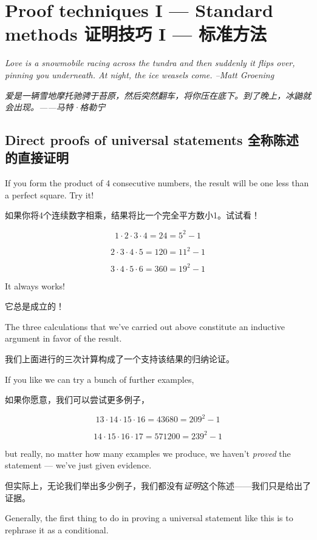

\chapter[Proof techniques I]{Proof techniques I --- Standard methods 证明技巧 I --- 标准方法}
\label{ch:proof1}

{\em Love is a snowmobile racing across the tundra and then suddenly it %
 flips over, pinning you underneath. At night, the  %
 ice weasels come. --Matt Groening} 

{\em 爱是一辆雪地摩托驰骋于苔原，然后突然翻车，将你压在底下。到了晚上，冰鼬就会出现。——马特·格勒宁}

\section{Direct proofs of universal statements 全称陈述的直接证明}
\label{sec:direct}

If you form the product of 4 consecutive numbers, the result will be one 
less than a perfect square. Try it!

如果你将4个连续数字相乘，结果将比一个完全平方数小1。试试看！

\[ 1 \cdot 2 \cdot 3 \cdot 4 = 24 = 5^2 - 1 \]

\[ 2 \cdot 3 \cdot 4 \cdot 5 = 120 = 11^2 - 1 \]

\[ 3 \cdot 4 \cdot 5 \cdot 6 = 360 = 19^2 - 1 \]

It always works!

它总是成立的！

The three calculations that we've carried out above constitute an
inductive argument in favor of the result.

我们上面进行的三次计算构成了一个支持该结果的归纳论证。

If you like we can try 
a bunch of further examples,

如果你愿意，我们可以尝试更多例子，

\[ 13 \cdot 14 \cdot 15 \cdot 16 = 43680 = 209^2 - 1 \]

\[ 14 \cdot 15 \cdot 16 \cdot 17 = 571200 = 239^2 - 1 \]

\noindent but really, no matter how many examples we produce, we haven't 
{\em proved} the statement --- we've just given evidence.

\noindent 但实际上，无论我们举出多少例子，我们都没有{\em 证明}这个陈述——我们只是给出了证据。

Generally, the first thing to do in proving a universal statement like 
this is to rephrase it as a conditional.


